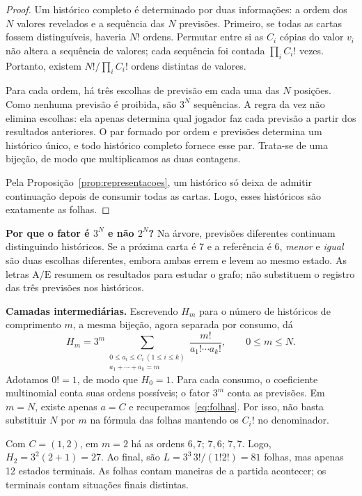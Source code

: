 \documentclass[11pt,a4paper]{article}
\theoremstyle{definition}
\newcommand{\A}{\mathrm{A}}
\newcommand{\Er}{\mathrm{E}}
\newcommand{\destaque}[1]{\par\smallskip\noindent\textbf{#1}\enspace}
\begin{document}
\begin{proof}
Um histórico completo é determinado por duas informações: a ordem dos $N$ valores revelados e a sequência das $N$ previsões. Primeiro, se todas as cartas fossem distinguíveis, haveria $N!$ ordens. Permutar entre si as $C_i$ cópias do valor $v_i$ não altera a sequência de valores; cada sequência foi contada $\prod_i C_i!$ vezes. Portanto, existem $N!/\prod_i C_i!$ ordens distintas de valores.

Para cada ordem, há três escolhas de previsão em cada uma das $N$ posições. Como nenhuma previsão é proibida, são $3^N$ sequências. A regra da vez não elimina escolhas: ela apenas determina qual jogador faz cada previsão a partir dos resultados anteriores. O par formado por ordem e previsões determina um histórico único, e todo histórico completo fornece esse par. Trata-se de uma bijeção, de modo que multiplicamos as duas contagens.

Pela Proposição~\ref{prop:representacoes}, um histórico só deixa de admitir continuação depois de consumir todas as cartas. Logo, esses históricos são exatamente as folhas.
\end{proof}

\destaque{Por que o fator é $3^N$ e não $2^N$?}
Na árvore, previsões diferentes continuam distinguindo históricos. Se a próxima carta é 7 e a referência é 6, \emph{menor} e \emph{igual} são duas escolhas diferentes, embora ambas errem e levem ao mesmo estado. As letras $\A/\Er$ resumem os resultados para estudar o grafo; não substituem o registro das três previsões nos históricos.

\destaque{Camadas intermediárias.}
Escrevendo $H_m$ para o número de históricos de comprimento $m$, a mesma bijeção, agora separada por consumo, dá
\begin{equation}\label{eq:historicoscamada}
H_m=3^m\!\sum_{\substack{0\le a_i\le C_i\ (1\le i\le k)\\a_1+\cdots+a_k=m}}
\frac{m!}{a_1!\cdots a_k!},\qquad 0\le m\le N.
\end{equation}
Adotamos $0!=1$, de modo que $H_0=1$. Para cada consumo, o coeficiente multinomial conta suas ordens possíveis; o fator $3^m$ conta as previsões. Em $m=N$, existe apenas $a=C$ e recuperamos~\eqref{eq:folhas}. Por isso, não basta substituir $N$ por $m$ na fórmula das folhas mantendo os $C_i!$ no denominador.

Com $C=(1,2)$, em $m=2$ há as ordens $6,7$; $7,6$; $7,7$. Logo, $H_2=3^2(2+1)=27$. Ao final, são $L=3^3\,3!/(1!2!)=81$ folhas, mas apenas 12 estados terminais. As folhas contam maneiras de a partida acontecer; os terminais contam situações finais distintas.
\end{document}
